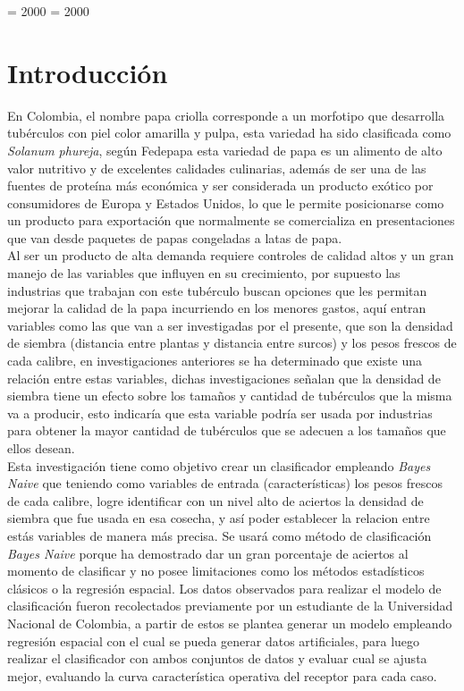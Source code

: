 
\righthyphenmin = 2000
\lefthyphenmin = 2000

\chapter*{Introducci\'on}

En Colombia, el nombre papa criolla corresponde a un morfotipo que desarrolla tubérculos con piel color amarilla y pulpa, esta variedad ha sido clasificada como \textit{Solanum phureja}, según Fedepapa esta variedad de papa es un alimento de alto valor nutritivo y de excelentes calidades culinarias, además de ser una de las fuentes de proteína más económica y ser considerada un producto exótico por consumidores de Europa y Estados Unidos, lo que le permite posicionarse como un producto para exportación que normalmente se comercializa en presentaciones que van desde paquetes de papas congeladas a latas de papa.\\

Al ser un producto de alta demanda requiere controles de calidad altos y un gran manejo de las variables que influyen en su crecimiento, por supuesto las industrias que trabajan con este tubérculo buscan opciones que les permitan mejorar la calidad de la papa incurriendo en los menores gastos, aquí entran variables como las que van a ser investigadas por el presente, que son la densidad de siembra (distancia entre plantas y distancia entre surcos) y los pesos frescos de cada calibre, en investigaciones anteriores se ha determinado que existe una relación entre estas variables, dichas investigaciones señalan que la densidad de siembra tiene un efecto sobre los tamaños y cantidad de tubérculos que la misma va a producir, esto indicaría que esta variable podría ser usada por industrias para obtener la mayor cantidad de tubérculos que se adecuen a los tamaños que ellos desean. \\

Esta investigación tiene como objetivo crear un clasificador empleando \textit{Bayes Naive} que teniendo como variables de entrada (características) los pesos frescos de cada calibre, logre identificar con un nivel alto de aciertos la densidad de siembra que fue usada en esa cosecha, y así poder establecer la relacion entre estás variables de manera más precisa. Se usará como método de clasificación \textit{Bayes Naive} porque ha demostrado dar un gran porcentaje de aciertos al momento de clasificar y no posee limitaciones como los métodos estadísticos clásicos o la regresión espacial. Los datos observados para realizar el modelo de clasificación fueron recolectados previamente por un estudiante de la Universidad Nacional de Colombia, a partir de estos se plantea generar un modelo empleando regresión espacial con el cual se pueda generar datos artificiales, para luego realizar el clasificador con ambos conjuntos de datos y evaluar cual se ajusta mejor, evaluando la curva característica operativa del receptor para cada caso.\\ 

